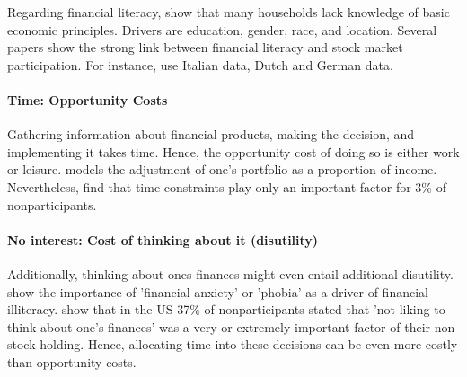 \documentclass[ProjectABM]{subfiles}
\begin{document}
Regarding financial literacy, \cite{lusardi_mitchell_2011financial_literacy} show that many households lack knowledge of basic economic principles. Drivers are education, gender, race, and location.%
Several papers show the strong link between financial literacy and stock market participation. For instance, \cite{guiso_japelli_2002household_book} use Italian data, \cite{hochguertel_et_al_2002household,vanrooij_et_al_2011} Dutch and \cite{borsch_eymann_2000household} German data.

\paragraph{Time: Opportunity Costs}
Gathering information about financial products, making the decision, and implementing it takes time. Hence, the opportunity cost of doing so is either work or leisure. \cite{bonaparte_et_al_2012adjustment} models the adjustment of one's portfolio as a proportion of income. Nevertheless, \cite{choi_2020} find that time constraints play only an important factor for 3\% of nonparticipants. %

\paragraph{No interest: Cost of thinking about it (disutility)}
Additionally, thinking about ones finances might even entail additional disutility. \cite{shapiro_burchell_2012} show the importance of 'financial anxiety' or 'phobia' as a driver of financial illiteracy. \cite{choi_2020} show that in the US 37\% of nonparticipants stated that 'not liking to think about one's finances' was a very or extremely important factor of their non-stock holding. Hence, allocating time into these decisions can be even more costly than opportunity costs.
\end{document}
